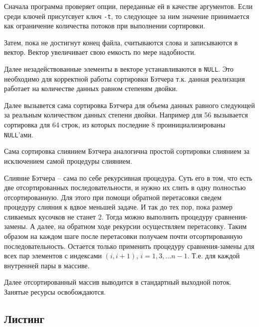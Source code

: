 \documentclass[12pt]{article}
\begin{document}
Сначала программа проверяет опции, переданные ей в качестве аргументов. Если среди ключей присутсвует ключ \verb|-t|, то следующее за ним значение принимается как ограничение количества потоков при выполнении сортировки.

Затем, пока не достигнут конец файла, считываются слова и записываются в вектор. Вектор увеличивает свою емкость по мере надобности.

Далее незадействованные элементы в векторе устанавливаются в \verb|NULL|. Это необходимо для корректной работы сортировки Бэтчера т.к. данная реализация работает на количестве данных равном степеням двойки.

Далее вызывется сама сортировка Бэтчера для объема данных равного следующей за реальным количеством данных степени двойки. Например для 56 вызывается сортировка для 64 строк, из которых последние 8 проинициализированы \verb|NULL|'ами.

Сама сортировка слиянием Бэтчера аналогична простой сортировки слиянием за исключением
самой процедуры слиянием.

Слияние Бэтчера -- сама по себе рекурсивная процедура. Суть его в том, что есть две отсортированных последовательности, и нужно их слить в одну полностью отсортированную.
Для этого при помощи обратной перетасовки сведем процедуру слияния к вдвое меньшей задаче. И так до тех пор, пока размер сливаемых кусочков не станет 2. Тогда можно выполнить процедуру сравнения-замены. А далее, на обратном ходе рекурсии осуществляем перетасовку. Таким образом на каждом шаге после перетасовки получаем почти отсортированную последовательность. Остается только применить процедуру сравнения-замены для всех пар элементов с индексами $(i, i+1)$, $i = 1, 3, ... n-1$. Т.е. для каждой внутренней пары в массиве. 

Далее отсортированный массив выводится в стандартный выходной поток.
Занятые ресурсы освобождаются.

\subsection*{Листинг}
\end{document}
